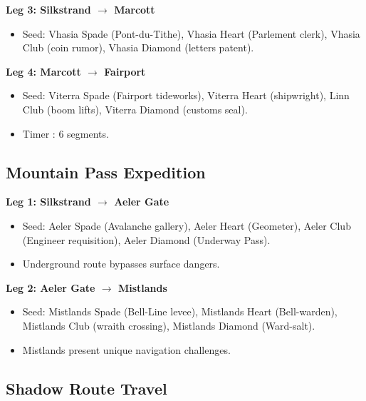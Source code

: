 \textbf{Leg 3: Silkstrand $\rightarrow$ Marcott}
\begin{itemize}
    \item Seed: Vhasia Spade (Pont-du-Tithe), Vhasia Heart (Parlement clerk), Vhasia Club (coin rumor), Vhasia Diamond (letters patent).
\end{itemize}

\textbf{Leg 4: Marcott $\rightarrow$ Fairport}
\begin{itemize}
    \item Seed: Viterra Spade (Fairport tideworks), Viterra Heart (shipwright), Linn Club (boom lifts), Viterra Diamond (customs seal).
    \item Timer : 6 segments.
\end{itemize}

\subsection{Mountain Pass Expedition}\label{subsec:mountain_pass}

\textbf{Leg 1: Silkstrand $\rightarrow$ Aeler Gate}
\begin{itemize}
    \item Seed: Aeler Spade (Avalanche gallery), Aeler Heart (Geometer), Aeler Club (Engineer requisition), Aeler Diamond (Underway Pass).
    \item Underground route bypasses surface dangers.
\end{itemize}

\textbf{Leg 2: Aeler Gate $\rightarrow$ Mistlands}
\begin{itemize}
    \item Seed: Mistlands Spade (Bell-Line levee), Mistlands Heart (Bell-warden), Mistlands Club (wraith crossing), Mistlands Diamond (Ward-salt).
    \item Mistlands present unique navigation challenges.
\end{itemize}

\subsection{Shadow Route Travel}\label{subsec:shadow_route}

